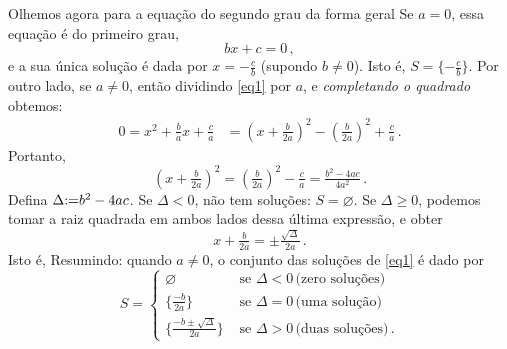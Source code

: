 Olhemos agora para a equação do segundo grau da forma geral
Se $a=0$, essa equação é do primeiro grau,
$$bx+c=0\,,$$
e a sua única solução é dada por $x=-\frac{c}{b}$ (supondo $b\neq 0$). Isto é,
$S=\{-\frac{c}{b}\}$. Por outro lado, se $a\neq 0$, então dividindo \eqref{eq1} por $a$, e
\emph{completando o quadrado} obtemos:
\begin{align*}
0= x^2+\tfrac{b}{a}x+\tfrac{c}{a}&=(x+\tfrac{b}{2a})^2-(\tfrac{b}{2a})^2+\tfrac{c}{a}\,.
\end{align*}
Portanto,
$$(x+\tfrac{b}{2a})^2=(\tfrac{b}{2a})^2-\tfrac{c}{a}=\tfrac{b^2-4ac}{4a^2}\,.$$
Defina $\Delta{:=} b^2-4ac$. Se $\Delta<0$, não tem soluções:
$S=\varnothing$.
Se $\Delta\geq 0$, podemos tomar a raiz quadrada em ambos lados
dessa última expressão, e obter 
$$x+\tfrac{b}{2a}=\pm\tfrac{\sqrt{\Delta}}{2a}\,.$$
Isto é,
Resumindo: quando $a\neq 0$, o conjunto das soluções de \eqref{eq1} é dado por
$$S=
\begin{cases}
 \varnothing&\text{ se }\Delta<0\,\text{(zero soluções)}\\
\{\tfrac{-b}{2a}\}&\text{ se }\Delta=0\,\text{(uma solução)}\\
\{\tfrac{-b\pm \sqrt{\Delta}}{2a}\}&\text{ se }\Delta>0\, \text{(duas soluções)}\,.
\end{cases}
$$
